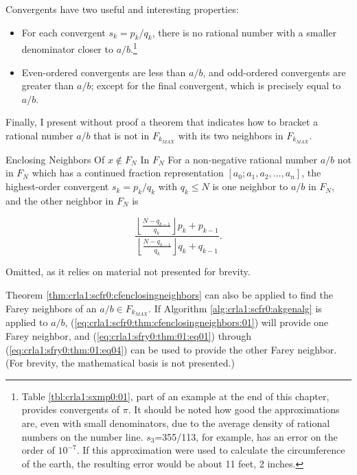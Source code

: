Convergents have two useful and interesting properties:

\begin{itemize}
\item For each convergent $s_k = p_k/q_k$, there is no rational number
      with a smaller denominator closer to $a/b$\@.\footnote{Table
      \ref{tbl:crla1:sxmp0:01}, part of an example at the end
      of this chapter, provides convergents of $\pi$\@.  It should be
      noted how good the approximations are, even with small denominators,
      due to the average density of rational numbers on the number line\@.
      $s_3$=355/113, for example, has an error on the order of $10^{-7}$\@.
      If this approximation were used to calculate the circumference of the
      earth, the resulting error would be about 11 feet, 2 inches.}
\item Even-ordered convergents are less than $a/b$, and odd-ordered
      convergents are greater than $a/b$; except for the final convergent,
      which is precisely equal to $a/b$.
\end{itemize}

Finally, I present without proof a theorem that indicates how to bracket
a rational number $a/b$ that is not in $F_{k_{MAX}}$ with its two neighbors
in $F_{k_{MAX}}$.

\begin{vworktheoremstatementpar}{Enclosing Neighbors Of \mbox{\boldmath $x \notin F_N$}
                                 In \mbox{\boldmath $F_N$}}
\label{thm:crla1:scfr0:cfenclosingneighbors}
For a non-negative rational
number $a/b$ not in
$F_N$ which has a
continued fraction representation
$[a_0;a_1,a_2,\ldots{} ,a_n]$, the
highest-order convergent $s_k = p_k/q_k$ with $q_k \leq N$ is one
neighbor
to $a/b$ in $F_N$, and the other neighbor in
$F_N$ is

\begin{equation}
\label{eq:crla1:scfr0:thm:cfenclosingneighbors:01}
\frac{{\displaystyle{\left\lfloor {\frac{{N - q_{k - 1} }}{{q_k }}} \right\rfloor}
 p_k  + p_{k - 1} }}{{\displaystyle{\left\lfloor {\frac{{N - q_{k - 1} }}{{q_k }}}
 \right\rfloor} q_k  + q_{k - 1} }}.
\end{equation}
\end{vworktheoremstatementpar}
\begin{vworktheoremproof}
Omitted, as it relies on material not presented for brevity.
\end{vworktheoremproof}
\vworktheoremfooter{}

Theorem \ref{thm:crla1:scfr0:cfenclosingneighbors} can also be applied to
find the Farey neighbors of an $a/b \in F_{k_{MAX}}$.  If
Algorithm \ref{alg:crla1:scfr0:akgenalg} is applied to $a/b$,
(\ref{eq:crla1:scfr0:thm:cfenclosingneighbors:01}) will provide one Farey
neighbor, and (\ref{eq:crla1:sfry0:thm:01:eq01}) through
(\ref{eq:crla1:sfry0:thm:01:eq04}) can be used to provide the other Farey
neighbor\@.  (For brevity, the mathematical basis is not presented.)

